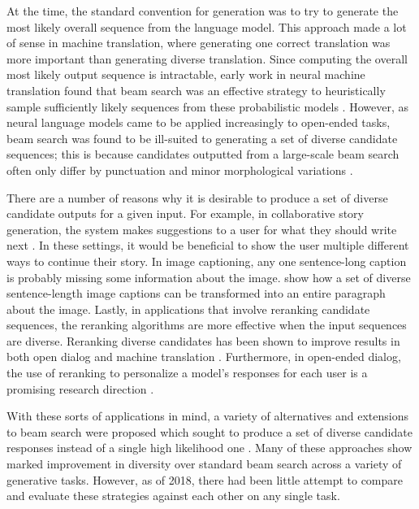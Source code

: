At the time, the standard convention for generation was to try to generate the most likely overall sequence from the language model.
This approach made a lot of sense in machine translation, where generating one correct translation was more important than generating diverse translation.
Since computing the overall most likely output sequence is intractable, early work in neural machine translation found that beam search was an effective strategy to heuristically sample sufficiently likely sequences from these probabilistic models \cite{sutskever2014sequence}.
However, as neural language models came to be applied increasingly to open-ended tasks, beam search was found to be ill-suited to generating a set of diverse candidate sequences; this is because candidates outputted from a large-scale beam search often only differ by punctuation and minor morphological variations \cite{li2016mutual}.

There are a number of reasons why it is desirable to produce a set of diverse candidate outputs for a given input.
For example, in collaborative story generation, the system makes suggestions to a user for what they should write next \cite{clark2018creative}.
In these settings, it would be beneficial to show the user multiple different ways to continue their story.
In image captioning, any one sentence-long caption is probably missing some information about the image.
\citet{krause2017hierarchical} show how a set of diverse sentence-length image captions can be transformed into an entire paragraph about the image.
Lastly, in applications that involve reranking candidate sequences, the reranking algorithms are more effective when the input sequences are diverse.
Reranking diverse candidates has been shown to improve results in both open dialog and machine translation \cite{li2016diversity,li2016mutual,gimpel2013systematic}. 
Furthermore, in open-ended dialog, the use of reranking to personalize a model's responses for each user is a promising research direction \cite{Choudhary2017DomainAN}.

With these sorts of applications in mind, a variety of alternatives and extensions to beam search were proposed which sought to produce a set of diverse candidate responses instead of a single high likelihood one \cite{li2016diversity,vijayakumar2016diverse,kulikov2018importance,tam2019clustered}.
Many of these approaches show marked improvement in diversity over standard beam search across a variety of generative tasks.
However, as of 2018, there had been little attempt to compare and evaluate these strategies against each other on any single task.

